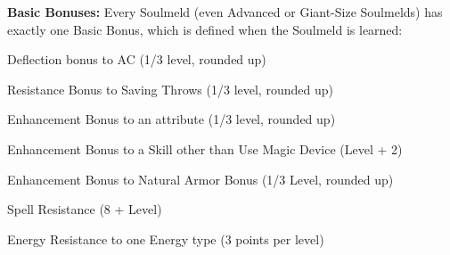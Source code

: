 \textbf{Basic Bonuses:} Every Soulmeld (even Advanced or Giant-Size Soulmelds) has exactly one Basic Bonus, which is defined when the Soulmeld is learned:
\begin{itemize*}
\item Deflection bonus to AC (1/3 level, rounded up) 
\item Resistance Bonus to Saving Throws (1/3 level, rounded up) 
\item Enhancement Bonus to an attribute (1/3 level, rounded up) 
\item Enhancement Bonus to a Skill other than Use Magic Device (Level + 2) 
\item Enhancement Bonus to Natural Armor Bonus (1/3 Level, rounded up) 
\item Spell Resistance (8 + Level) 
\item Energy Resistance to one Energy type (3 points per level)
\end{itemize*}

